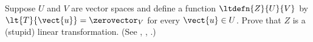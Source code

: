 Suppose $U$ and $V$ are vector spaces and define a function $\ltdefn{Z}{U}{V}$ by $\lt{T}{\vect{u}}=\zerovector_{V}$ for every $\vect{u}\in U$.  Prove that $Z$ is a (stupid) linear transformation.  (See , , .)